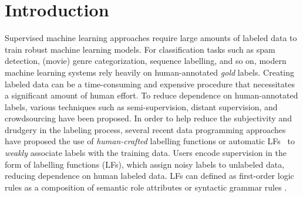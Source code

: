 \documentclass[11pt]{article}
\begin{document}
\maketitle


\section{Introduction}
Supervised machine learning approaches require large amounts of labeled data to train robust machine learning models. 
For classification tasks such as spam detection, (movie) genre categorization, sequence labelling, and so on, modern machine learning systems rely heavily on human-annotated \textit{gold} labels. Creating labeled data can be a time-consuming and expensive procedure that necessitates a significant amount of human effort.
To reduce dependence on human-annotated labels, various techniques such as semi-supervision, distant supervision, and crowdsourcing have been proposed.
In order to help reduce the subjectivity and drudgery in the labeling process, several recent data programming approaches~\citep{bach2019snorkel,  oishik, awasthi2020learning, spear} have proposed the use of \textit{human-crafted} labelling functions or automatic LFs~\citep{maheshwari2022learning} to \textit{weakly} associate labels with the training data. Users encode supervision in the form of labelling functions (LFs), which assign noisy labels to unlabeled data, reducing dependence on human labeled data. LFs can defined as first-order logic rules as a composition of semantic role attributes \cite{sen2020learning} or syntactic grammar rules \cite{sahay2021rule}.
\end{document}
